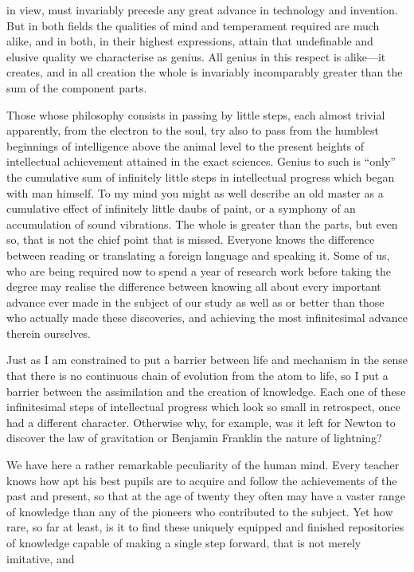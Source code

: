 \documentclass[10.5pt,twoside]{book}
\newcommand{\origpage}[1]{\clearpage\setcounter{page}{#1}}
\begin{document}
\origpage{23}

\noindent in view, must invariably precede any great advance in technology and
invention. But in both fields the qualities of mind and temperament required
are much alike, and in both, in their highest expressions, attain that
undefinable and elusive quality we characterise as genius. All genius in this
respect is alike---it creates, and in all creation the whole is invariably
incomparably greater than the sum of the component parts.

Those whose philosophy consists in passing by little steps, each almost
trivial apparently, from the electron to the soul, try also to pass from the
humblest beginnings of intelligence above the animal level to the present
heights of intellectual achievement attained in the exact sciences. Genius to
such is ``only'' the cumulative sum of infinitely little steps in intellectual
progress which began with man himself. To my mind you might as well describe
an old master as a cumulative effect of infinitely little daubs of paint, or a
symphony of an accumulation of sound vibrations. The whole is greater than the
parts, but even so, that is not the chief point that is missed. Everyone knows
the difference between reading or translating a foreign language and speaking
it. Some of us, who are being required now to spend a year of research work
before taking the degree may realise the difference between knowing all about
every important advance ever made in the subject of our study as well as or
better than those who actually made these discoveries, and achieving the most
infinitesimal advance therein ourselves.

Just as I am constrained to put a barrier between life and mechanism in the
sense that there is no continuous chain of evolution from the atom to life, so
I put a barrier between the assimilation and the creation of knowledge. Each
one of these infinitesimal steps of intellectual progress which look so small
in retrospect, once had a different character. Otherwise why, for example, was
it left for Newton to discover the law of gravitation or Benjamin Franklin the
nature of lightning?

We have here a rather remarkable peculiarity of the human mind. Every teacher
knows how apt his best pupils are to acquire and follow the achievements of
the past and present, so that at the age of twenty they often may have a
vaster range of knowledge than any of the pioneers who contributed to the
subject. Yet how rare, so far at least, is it to find these uniquely equipped
and finished repositories of knowledge capable of making a single step
forward, that is not merely imitative, and
\end{document}
